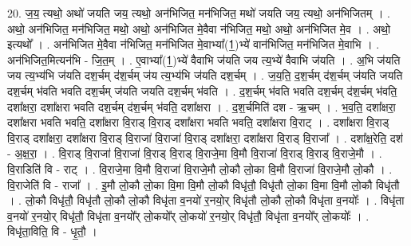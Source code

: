 \documentclass[17pt]{extarticle}
\begin{document}
20. ज॒य॒ त्यथो॒ अथो॑ जयति जय॒ त्यथो॒ अन॑भिजित॒ मन॑भिजित॒ मथो॑ जयति जय॒ त्यथो॒ अन॑भिजितम् । . अथो॒ अन॑भिजित॒ मन॑भिजित॒ मथो॒ अथो॒ अन॑भिजित मे॒वैवा न॑भिजित॒ मथो॒ अथो॒ अन॑भिजित मे॒व । . अथो॒ इत्यथो᳚ । . अन॑भिजित मे॒वैवा न॑भिजित॒ मन॑भिजित मे॒वाभ्या᳚(1॒)भ्ये॑ वान॑भिजित॒ मन॑भिजित मे॒वाभि । . अन॑भिजित॒मित्यन॑भि - जि॒त॒म् । . ए॒वाभ्या᳚(1॒)भ्ये॑ वैवाभि ज॑यति जय त्य॒भ्ये॑ वैवाभि ज॑यति । . अ॒भि ज॑यति जय त्य॒भ्य॑भि ज॑यति दश॒र्चम् द॑श॒र्चम् ज॑य त्य॒भ्य॑भि ज॑यति दश॒र्चम् । . ज॒य॒ति॒ द॒श॒र्चम् द॑श॒र्चम् ज॑यति जयति दश॒र्चम् भ॑वति भवति दश॒र्चम् ज॑यति जयति दश॒र्चम् भ॑वति । . द॒श॒र्चम् भ॑वति भवति दश॒र्चम् द॑श॒र्चम् भ॑वति॒ दशा᳚क्षरा॒ दशा᳚क्षरा भवति दश॒र्चम् द॑श॒र्चम् भ॑वति॒ दशा᳚क्षरा । . द॒श॒र्चमिति॑ दश - ऋ॒चम् । . भ॒व॒ति॒ दशा᳚क्षरा॒ दशा᳚क्षरा भवति भवति॒ दशा᳚क्षरा वि॒राड् वि॒राड् दशा᳚क्षरा भवति भवति॒ दशा᳚क्षरा वि॒राट् । . दशा᳚क्षरा वि॒राड् वि॒राड् दशा᳚क्षरा॒ दशा᳚क्षरा वि॒राड् वि॒राजा॑ वि॒राजा॑ वि॒राड् दशा᳚क्षरा॒ दशा᳚क्षरा वि॒राड् वि॒राजा᳚ । . दशा᳚क्ष॒रेति॒ दश॑ - अ॒क्ष॒रा॒ । . वि॒राड् वि॒राजा॑ वि॒राजा॑ वि॒राड् वि॒राड् वि॒राजे॒मा वि॒मौ वि॒राजा॑ वि॒राड् वि॒राड् वि॒राजे॒मौ । . वि॒राडिति॑ वि - राट् । . वि॒राजे॒मा वि॒मौ वि॒राजा॑ वि॒राजे॒मौ लो॒कौ लो॒का वि॒मौ वि॒राजा॑ वि॒राजे॒मौ लो॒कौ । . वि॒राजेति॑ वि - राजा᳚ । . इ॒मौ लो॒कौ लो॒का वि॒मा वि॒मौ लो॒कौ विधृ॑तौ॒ विधृ॑तौ लो॒का वि॒मा वि॒मौ लो॒कौ विधृ॑तौ । . लो॒कौ विधृ॑तौ॒ विधृ॑तौ लो॒कौ लो॒कौ विधृ॑ता व॒नयो॑ र॒नयो॒र् विधृ॑तौ लो॒कौ लो॒कौ विधृ॑ता व॒नयोः᳚ । . विधृ॑ता व॒नयो॑ र॒नयो॒र् विधृ॑तौ॒ विधृ॑ता व॒नयो᳚र् लो॒कयो᳚र् लो॒कयो॑ र॒नयो॒र् विधृ॑तौ॒ विधृ॑ता व॒नयो᳚र् लो॒कयोः᳚ । . विधृ॑ता॒विति॒ वि - धृ॒तौ॒ । \newline
\end{document}
